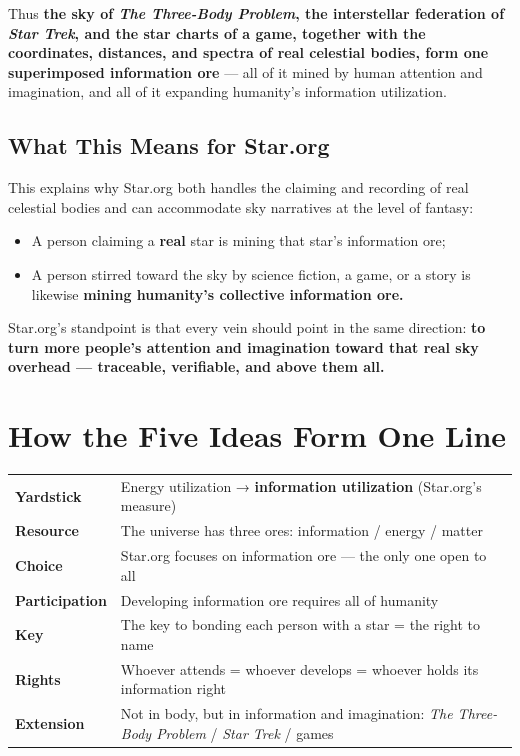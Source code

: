 \documentclass[11pt,fontset=none]{ctexart}
\begin{document}
Thus \textbf{the sky of \emph{The Three-Body Problem}, the interstellar federation of \emph{Star Trek}, and the star charts of a game, together with the coordinates, distances, and spectra of real celestial bodies, form one superimposed information ore} — all of it mined by human attention and imagination, and all of it expanding humanity's information utilization.

\subsection{What This Means for Star.org}

This explains why Star.org both handles the claiming and recording of real celestial bodies and can accommodate sky narratives at the level of fantasy:

\begin{itemize}
  \item A person claiming a \textbf{real} star is mining that star's information ore;
  \item A person stirred toward the sky by science fiction, a game, or a story is likewise \textbf{mining humanity's collective information ore.}
\end{itemize}


Star.org's standpoint is that every vein should point in the same direction: \textbf{to turn more people's attention and imagination toward that real sky overhead — traceable, verifiable, and above them all.}

\section{How the Five Ideas Form One Line}

\begin{center}
\sffamily\small
\begin{tabularx}{0.96\linewidth}{@{}l X@{}}
\toprule
\textbf{Yardstick} & Energy utilization → \textbf{information utilization} (Star.org's measure) \\
\textbf{Resource} & The universe has three ores: information / energy / matter \\
\textbf{Choice} & Star.org focuses on information ore — the only one open to all \\
\textbf{Participation} & Developing information ore requires all of humanity \\
\textbf{Key} & The key to bonding each person with a star = the right to name \\
\textbf{Rights} & Whoever attends = whoever develops = whoever holds its information right \\
\textbf{Extension} & Not in body, but in information and imagination: \emph{The Three-Body Problem} / \emph{Star Trek} / games \\
\bottomrule
\end{tabularx}
\end{center}
\end{document}
